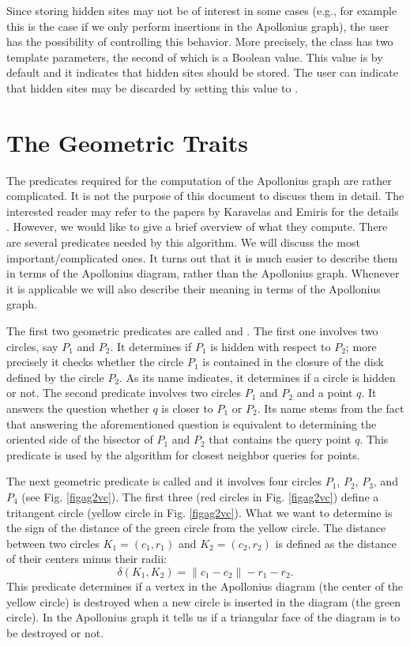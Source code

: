 Since storing hidden sites may not be of interest in some cases (e.g.,
for example this is the case if we only perform insertions in the
Apollonius graph), the user has the possibility of controlling this
behavior. More precisely, the class
 has two template
parameters, the second of which is a Boolean value. This value is by
default  and it indicates that hidden sites should be
stored. The user can indicate that hidden sites may be discarded
by setting this value to .


\section{The Geometric Traits\label{sec:apollonius2-traits}}

The predicates required for the computation of the Apollonius graph
are rather complicated. It is not the purpose of this document to
discuss them in detail. The interested reader may refer to the papers
by Karavelas and Emiris for the details
\cite{cgal:ke-ppawv-02,cgal:ke-rctac-03}. However, we would like to give a brief
overview of what they 
compute. There are several predicates needed by this algorithm. We
will discuss the most important/complicated ones. It turns out that
it is much easier to describe them in terms of the Apollonius diagram,
rather than the Apollonius graph. Whenever it is applicable we will also
describe their meaning in terms of the Apollonius graph.


The first two geometric predicates are called
 and . The first one
involves two circles, say $P_1$ and $P_2$. It determines if $P_1$ is
hidden with respect to $P_2$; more precisely it checks whether the
circle $P_1$ is contained in the closure of the disk defined by the
circle $P_2$. As its name indicates, it determines if a circle is
hidden or not. The second predicate involves two circles $P_1$ and
$P_2$ and a point $q$. It answers the question whether $q$ is closer
to $P_1$ or $P_2$. Its name stems from the fact that answering the
aforementioned question is equivalent to determining the oriented
side of the bisector of $P_1$ and $P_2$ that contains the query point
$q$. This predicate is used by the algorithm for closest neighbor
queries for points.


The next geometric predicate is called  and it
involves four circles $P_1$, $P_2$, $P_3$, and $P_4$ (see
Fig. \ref{figag2vc}). The first three (red circles in
Fig. \ref{figag2vc}) define a tritangent circle (yellow
circle in Fig. \ref{figag2vc}). What we want to determine is
the sign of the distance of the green circle from the yellow
circle. The distance between two circles $K_1=(c_1,r_1)$ and
$K_2=(c_2, r_2)$ is defined as the distance of their centers minus
their radii:
\[   \delta(K_1, K_2) = \|c_1-c_2\|-r_1-r_2. \]
This predicate determines if a vertex in the Apollonius diagram
(the center of the yellow circle) is destroyed when a new circle is
inserted in the diagram (the green circle). In the Apollonius graph
it tells us if a triangular face of the diagram is to be destroyed or
not.

